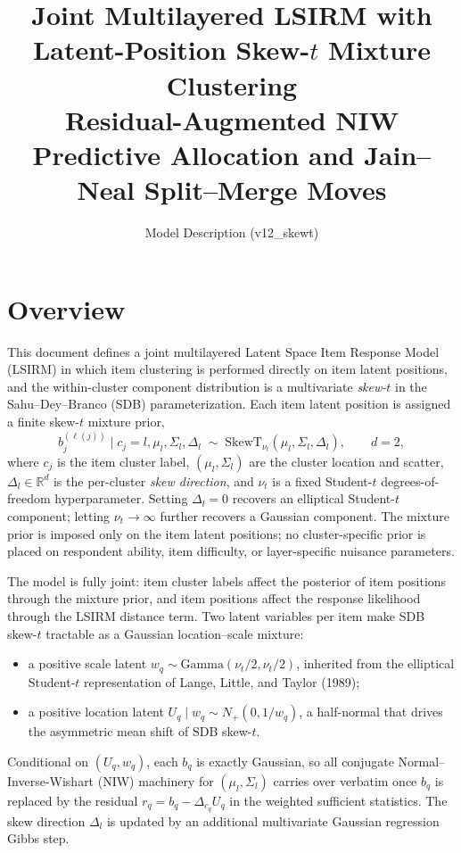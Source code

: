 \documentclass[11pt]{article}
\title{Joint Multilayered LSIRM with Latent-Position Skew-$t$ Mixture Clustering\\
Residual-Augmented NIW Predictive Allocation and Jain--Neal Split--Merge Moves}
\date{Model Description (v12\_skewt)}
\newcommand{\R}{\mathbb R}
\begin{document}
\maketitle

\section{Overview}

This document defines a joint multilayered Latent Space Item Response Model
(LSIRM) in which item clustering is performed directly on item latent
positions, and the within-cluster component distribution is a multivariate
\emph{skew-$t$} in the Sahu--Dey--Branco (SDB) parameterization.  Each item
latent position is assigned a finite skew-$t$ mixture prior,
\[
    b_j^{(\ell(j))}\mid c_j=l,\mu_l,\Sigma_l,\Delta_l
    \;\sim\; \mathrm{SkewT}_{\nu_t}(\mu_l,\Sigma_l,\Delta_l),
    \qquad d=2,
\]
where $c_j$ is the item cluster label, $(\mu_l,\Sigma_l)$ are the
cluster location and scatter, $\Delta_l\in\R^d$ is the per-cluster
\emph{skew direction}, and $\nu_t$ is a fixed Student-$t$ degrees-of-freedom
hyperparameter.  Setting $\Delta_l=0$ recovers an elliptical Student-$t$
component; letting $\nu_t\to\infty$ further recovers a Gaussian component.
The mixture prior is imposed only on the item latent positions; no
cluster-specific prior is placed on respondent ability, item difficulty, or
layer-specific nuisance parameters.

The model is fully joint: item cluster labels affect the posterior of item
positions through the mixture prior, and item positions affect the response
likelihood through the LSIRM distance term.  Two latent variables per item
make SDB skew-$t$ tractable as a Gaussian location--scale mixture:
\begin{itemize}[leftmargin=1.5em]
    \item a positive scale latent $w_q\sim\mathrm{Gamma}(\nu_t/2,\nu_t/2)$,
    inherited from the elliptical Student-$t$ representation
    of Lange, Little, and Taylor (1989);
    \item a positive location latent $U_q\mid w_q\sim N_+(0,1/w_q)$,
    a half-normal that drives the asymmetric mean shift of SDB skew-$t$.
\end{itemize}
Conditional on $(U_q,w_q)$, each $b_q$ is exactly Gaussian, so all
conjugate Normal--Inverse-Wishart (NIW) machinery for $(\mu_l,\Sigma_l)$
carries over verbatim once $b_q$ is replaced by the residual
$r_q=b_q-\Delta_{c_q}U_q$ in the weighted sufficient statistics.  The skew
direction $\Delta_l$ is updated by an additional multivariate Gaussian
regression Gibbs step.
\end{document}

